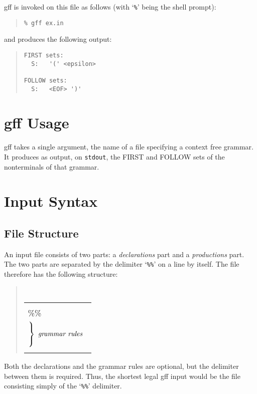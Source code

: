 \documentclass{article}
\newcommand{\gff}{{\sf gff }}
\begin{document}
\gff is invoked on this file as follows (with `{\tt \%}' being
the shell prompt):
%
\begin{quote}
{\tt \% gff ex.in}
\end{quote}
%
and produces the following output:
%
\begin{quote}
\begin{verbatim}
FIRST sets:
  S:   '(' <epsilon> 

FOLLOW sets:
  S:   <EOF> ')' 
\end{verbatim}
\end{quote}

\section{\gff Usage}

\gff takes a single argument, the name of a file specifying a context free
grammar.  It produces as output, on {\tt stdout}, the FIRST and FOLLOW sets
of the nonterminals of that grammar.

\section{Input Syntax}

\subsection{File Structure}

An input file consists of two parts: a {\em declarations} part and a
{\em productions} part.  The two parts are separated by the delimiter
`{\tt \%\%}' on a line by itself.  The file therefore has the following
structure: 
%
\begin{quote}
{\tt
\begin{tabular}{|l|}\hline
\begin{minipage}{3.5in}
$\left\}
   \begin{array}{ll}
	{~}\\
	{\mbox{\it declarations}}\\
	{~}\\ 
   \end{array}
 \right.$\\
\%\%\\
$\left\}
   \begin{array}{ll}
	{~}\\
	{\mbox{\it grammar rules}}\\
	{~}\\ 
   \end{array}
 \right.$\\
\end{minipage}
\\ \hline
\end{tabular}
}
\end{quote}
%
Both the declarations and the grammar rules are optional, but the 
delimiter between them is required.  Thus, the
shortest legal \gff input would be the file consisting simply of the
`{\tt \%\%}' delimiter.
\end{document}
